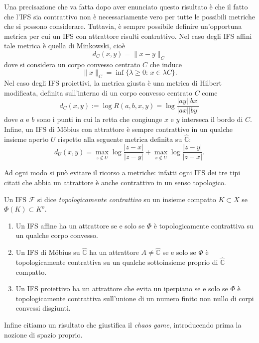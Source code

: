 Una precisazione che va fatta dopo aver enunciato questo risultato è che il fatto che l'IFS sia contrattivo non è necessariamente vero per tutte le possibili metriche che si possono considerare. Tuttavia, è sempre possibile definire un'opportuna metrica per cui un IFS con attrattore risulti contrattivo. 
Nel caso degli IFS affini tale metrica è quella di Minkowski, cioè
$$d_{C}(x,y) = \|x-y\|_{C}$$
dove si considera un corpo convesso centrato $C$ che induce 
$$\|x\|_{C} = \inf\{\lambda\geq0:\,x\in\lambda C\}.$$
Nel caso degli IFS proiettivi, la metrica giusta è una metrica di Hilbert modificata, definita sull'interno di un corpo convesso centrato $C$ come 
$$d_{C}(x,y):=\log R(a,b,x,y) = \log\frac{|ay||bx|}{|ax||by|}$$
dove $a$ e $b$ sono i punti in cui la retta che congiunge $x$ e $y$ interseca il bordo di $C$.
Infine, un IFS di M\"obius con attrattore è sempre contrattivo in un qualche insieme aperto $U$ rispetto alla seguente metrica definita su $\hat{\mathbb C}$: 
$$d_{U}(x,y) = \max_{z\not\in U}\log\frac{|z-x|}{|z-y|} + \max_{x\not\in U}\log\frac{|z-y|}{|z-x|}.$$

Ad ogni modo si può evitare il ricorso a metriche: infatti ogni IFS dei tre tipi citati che abbia un attrattore è anche contrattivo in un senso topologico. 
\begin{definizione}
	Un IFS $\mathcal F$ si dice \emph{topologicamente contrattivo} su un insieme compatto $K\subset X$ se $\Phi(K)\subset K^{o}$.
\end{definizione}
\begin{teorema}
	\begin{enumerate}
		\item Un IFS affine ha un attrattore se e solo se $\Phi$ è topologicamente contrattiva su un qualche corpo convesso.
		\item Un IFS di M\"obius su $\hat{\mathbb C}$ ha un attrattore $A\neq \hat{\mathbb C}$ se e solo se $\Phi$ è topologicamente contrattiva su un qualche sottoinsieme proprio di $\hat{\mathbb C}$ compatto.
		\item Un IFS proiettivo ha un attrattore che evita un iperpiano se e solo se $\Phi$ è topologicamente contrattiva sull'unione di un numero finito non nullo di corpi convessi disgiunti.
	\end{enumerate}
\end{teorema}

Infine citiamo un risultato che giustifica il \emph{chaos game}, introducendo prima la nozione di spazio proprio.

